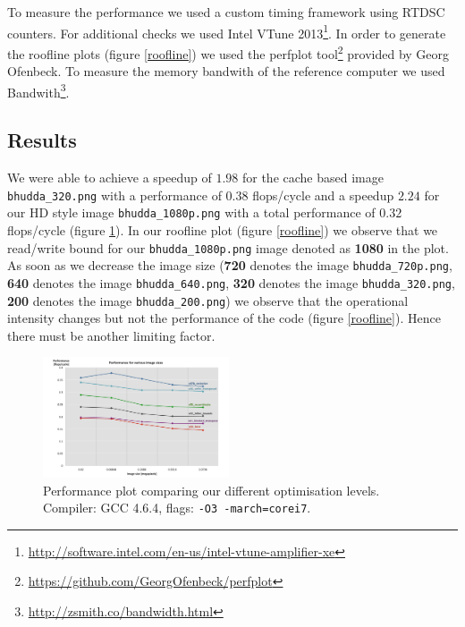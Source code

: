 To measure the performance we used a custom timing framework using RTDSC counters. For additional checks we used Intel VTune 2013\footnote{\url{http://software.intel.com/en-us/intel-vtune-amplifier-xe}}. In order to generate the roofline plots (figure \ref{roofline}) we used the perfplot tool\footnote{\url{https://github.com/GeorgOfenbeck/perfplot}} provided by Georg Ofenbeck. To measure the memory bandwith of the reference computer we used Bandwith\footnote{\url{http://zsmith.co/bandwidth.html}}.
\subsection{Results}
We were able to achieve a speedup of $1.98$ for the cache based image \texttt{bhudda\_320.png} with a performance of $0.38$ flops/cycle and a speedup $2.24$ for our HD style image \newline\texttt{bhudda\_1080p.png} with a total performance of $0.32$ flops/cycle (figure \ref{performance}). In our roofline plot \cite{Williams:2009:RIV:1498765.1498785} (figure \ref{roofline}) we observe that we read/write bound for our \texttt{bhudda\_1080p.png} image denoted as \textbf{1080} in the plot. As soon as we decrease the image size (\textbf{720} denotes the image \texttt{bhudda\_720p.png}, \textbf{640} denotes the image \texttt{bhudda\_640.png}, \textbf{320} denotes the image \texttt{bhudda\_320.png}, \textbf{200} denotes the image \texttt{bhudda\_200.png}) we observe that the operational intensity changes but not the performance of the code (figure \ref{roofline}). Hence there must be another limiting factor. 

\setlength\fboxsep{0pt}
\setlength\fboxrule{0.5pt}
 
\begin{figure}\vspace{-10mm}
  \includegraphics[trim=10mm 0mm 10mm 0mm, clip, width=0.49\textwidth]{figures/performance}
  \caption{Performance plot comparing our different optimisation levels. Compiler: GCC 4.6.4, flags: \lstinline{-O3 -march=corei7}.\label{performance}}
\end{figure}
 
